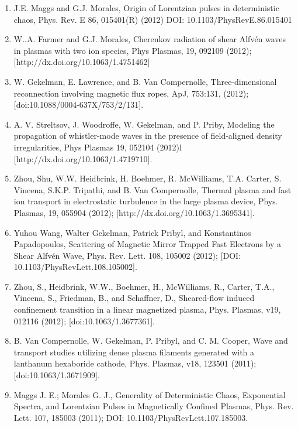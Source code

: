 \documentclass[11pt]{article}
\begin{document}
\begin{enumerate}
\item J.E. Maggs and G.J. Morales, Origin of Lorentzian pulses in deterministic chaos, Phys. Rev. E 86, 015401(R) (2012) DOI: 10.1103/PhysRevE.86.015401

\item  W..A. Farmer and G.J. Morales, Cherenkov radiation of shear Alfv\'{e}n waves in plasmas with two ion species, Phys Plasmas, 19, 092109 (2012); [http://dx.doi.org/10.1063/1.4751462]

\item  W. Gekelman, E. Lawrence, and B. Van Compernolle, Three-dimensional reconnection involving magnetic flux ropes, ApJ, 753:131, (2012); [doi:10.1088/0004-637X/753/2/131].

\item  A. V. Streltsov, J. Woodroffe, W. Gekelman, and P. Priby, Modeling the propagation of whistler-mode waves in the presence of field-aligned density irregularities, Phys Plasmas 19, 052104 (2012)l [http://dx.doi.org/10.1063/1.4719710].

\item  Zhou, Shu, W.W. Heidbrink, H. Boehmer, R. McWilliams, T.A. Carter, S. Vincena, S.K.P. Tripathi, and B. Van Compernolle, Thermal plasma and fast ion transport in electrostatic turbulence in the large plasma device, Phys. Plasmas, 19, 055904 (2012); [http://dx.doi.org/10.1063/1.3695341].

\item  Yuhou Wang, Walter Gekelman, Patrick Pribyl, and Konstantinos Papadopoulos, Scattering of Magnetic Mirror Trapped Fast Electrons by a Shear Alfv\'{e}n Wave, Phys. Rev. Lett. 108, 105002 (2012); [DOI: 10.1103/PhysRevLett.108.105002].

\item   Zhou, S., Heidbrink, W.W., Boehmer, H., McWilliams, R., Carter, T.A., Vincena, S., Friedman, B., and Schaffner, D., Sheared-flow induced confinement transition in a linear magnetized plasma, Phys. Plasmas, v19, 012116 (2012); [doi:10.1063/1.3677361].

\item   B. Van Compernolle, W. Gekelman, P. Pribyl, and C. M. Cooper, Wave and transport studies utilizing dense plasma filaments generated with a lanthanum hexaboride cathode, Phys. Plasmas, v18, 123501 (2011); [doi:10.1063/1.3671909].

\item  Maggs J. E.; Morales G. J., Generality of Deterministic Chaos, Exponential Spectra, and Lorentzian Pulses in Magnetically Confined Plasmas, Phys. Rev. Lett. 107, 185003 (2011); DOI: 10.1103/PhysRevLett.107.185003.


\end{enumerate}
\end{document}
